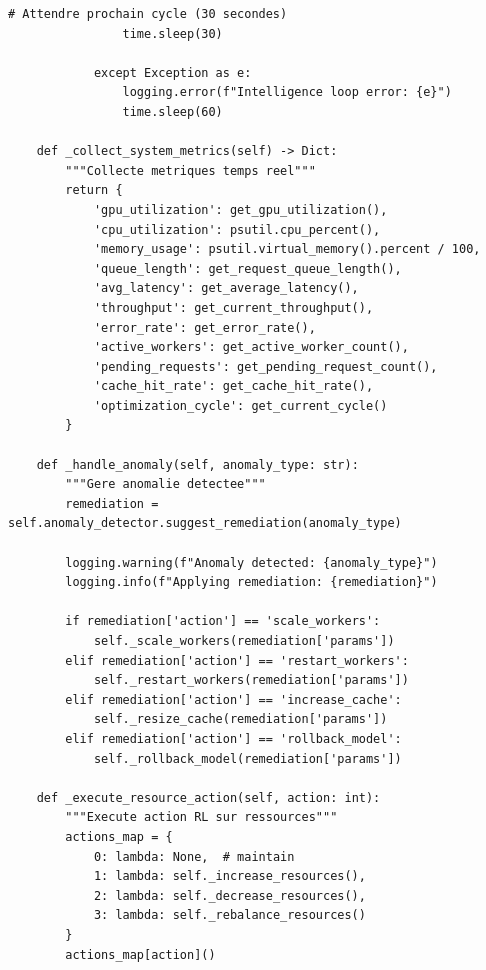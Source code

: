 \documentclass[12pt,a4paper]{article}
\begin{document}
\begin{lstlisting}[caption={Intelligent Orchestrator - Point Central}]
                # Attendre prochain cycle (30 secondes)
                time.sleep(30)
                
            except Exception as e:
                logging.error(f"Intelligence loop error: {e}")
                time.sleep(60)
                
    def _collect_system_metrics(self) -> Dict:
        """Collecte metriques temps reel"""
        return {
            'gpu_utilization': get_gpu_utilization(),
            'cpu_utilization': psutil.cpu_percent(),
            'memory_usage': psutil.virtual_memory().percent / 100,
            'queue_length': get_request_queue_length(),
            'avg_latency': get_average_latency(),
            'throughput': get_current_throughput(),
            'error_rate': get_error_rate(),
            'active_workers': get_active_worker_count(),
            'pending_requests': get_pending_request_count(),
            'cache_hit_rate': get_cache_hit_rate(),
            'optimization_cycle': get_current_cycle()
        }
        
    def _handle_anomaly(self, anomaly_type: str):
        """Gere anomalie detectee"""
        remediation = self.anomaly_detector.suggest_remediation(anomaly_type)
        
        logging.warning(f"Anomaly detected: {anomaly_type}")
        logging.info(f"Applying remediation: {remediation}")
        
        if remediation['action'] == 'scale_workers':
            self._scale_workers(remediation['params'])
        elif remediation['action'] == 'restart_workers':
            self._restart_workers(remediation['params'])
        elif remediation['action'] == 'increase_cache':
            self._resize_cache(remediation['params'])
        elif remediation['action'] == 'rollback_model':
            self._rollback_model(remediation['params'])
            
    def _execute_resource_action(self, action: int):
        """Execute action RL sur ressources"""
        actions_map = {
            0: lambda: None,  # maintain
            1: lambda: self._increase_resources(),
            2: lambda: self._decrease_resources(),
            3: lambda: self._rebalance_resources()
        }
        actions_map[action]()
        

\end{lstlisting}
\end{document}
